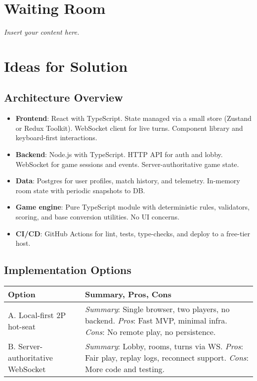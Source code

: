 \documentclass[12pt]{article}
\newcommand{\lips}{\textit{Insert your content here.}}
\begin{document}
\section{Waiting Room}
\lips

\section{Ideas for Solution}

\subsection{Architecture Overview}
\begin{itemize}
  \item \textbf{Frontend}: React with TypeScript. State managed via a small store (Zustand or Redux Toolkit). WebSocket client for live turns. Component library and keyboard-first interactions.
  \item \textbf{Backend}: Node.js with TypeScript. HTTP API for auth and lobby. WebSocket for game sessions and events. Server-authoritative game state.
  \item \textbf{Data}: Postgres for user profiles, match history, and telemetry. In-memory room state with periodic snapshots to DB.
  \item \textbf{Game engine}: Pure TypeScript module with deterministic rules, validators, scoring, and base conversion utilities. No UI concerns.
  \item \textbf{CI/CD}: GitHub Actions for lint, tests, type-checks, and deploy to a free-tier host.
\end{itemize}

\subsection{Implementation Options}
\begin{tabularx}{\textwidth}{lX}
  \toprule
  \textbf{Option} & \textbf{Summary, Pros, Cons} \\
  \midrule
  A. Local-first 2P hot-seat & \textit{Summary}: Single browser, two players, no backend. \textit{Pros}: Fast MVP, minimal infra. \textit{Cons}: No remote play, no persistence. \\
  \midrule
  B. Server-authoritative WebSocket & \textit{Summary}: Lobby, rooms, turns via WS. \textit{Pros}: Fair play, replay logs, reconnect support. \textit{Cons}: More code and testing. \\
  \midrule
\end{tabularx}
\end{document}
